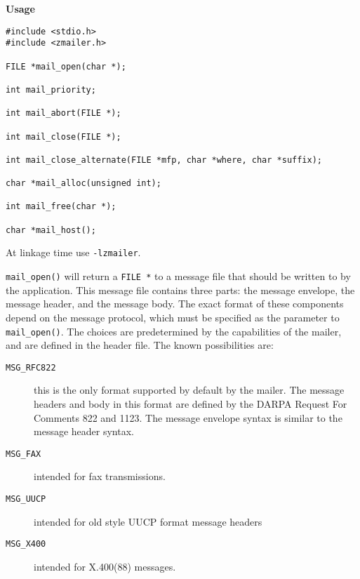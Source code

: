 
{\bf Usage}
\begin{tscreen}
\begin{verbatim}
#include <stdio.h>
#include <zmailer.h>

FILE *mail_open(char *);

int mail_priority;

int mail_abort(FILE *);

int mail_close(FILE *);

int mail_close_alternate(FILE *mfp, char *where, char *suffix);

char *mail_alloc(unsigned int);

int mail_free(char *);

char *mail_host();
\end{verbatim}
\end{tscreen}


At linkage time use {\tt -lzmailer}.

{\tt mail\_open()} will return a {\tt FILE *} to a message
file that should be written to by the application. This
message file contains three parts: the message envelope,
the message header, and the message body. The exact format of
these components depend on the message protocol,
which must be specified as the parameter to {\tt mail\_open()}.
The choices are predetermined by the capabilities of the
mailer, and are defined in the header file. The known
possibilities are:

\begin{description}
\item[ {\tt MSG\_RFC822}] \mbox{}

this is the only format supported 
by default by the mailer. The message headers and body in this format
are defined by the DARPA Request For Comments 822 and 1123. 
The message envelope syntax is similar to the message header syntax.



\item[ {\tt MSG\_FAX}] \mbox{}

intended for fax transmissions.



\item[ {\tt MSG\_UUCP}] \mbox{}

intended for old style UUCP format message headers



\item[ {\tt MSG\_X400}] \mbox{}

intended for X.400(88) messages.

\end{description}


